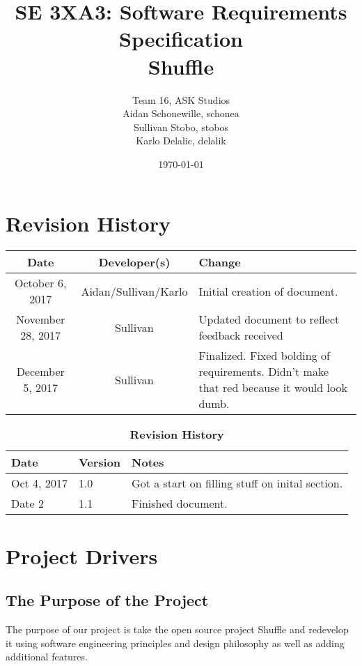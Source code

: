 \documentclass[12pt, titlepage]{article}
\title{SE 3XA3: Software Requirements Specification\\Shuffle}
\author{Team 16, ASK Studios
		\\ Aidan Schonewille, schonea
		\\ Sullivan Stobo, stobos
		\\ Karlo Delalic, delalik
}
\date{\today}
\begin{document}
\section*{Revision History}
\begin{center}
\begin{tabular}{| c | c | p{6cm} |}
\hline
\textbf{Date} & \textbf{Developer(s)} & \textbf{Change}\\
\hline
October 6, 2017 & Aidan/Sullivan/Karlo & Initial creation of document.\\
\hline
November 28, 2017 & Sullivan & Updated document to reflect feedback received \\
\hline
December 5, 2017 & Sullivan & Finalized.  Fixed bolding of requirements.  Didn't make that red because it would look dumb. \\
\hline
\end{tabular}
\end{center}

\maketitle

\tableofcontents
\listoftables
\listoffigures

\begin{table}[bp]
\caption{\bf Revision History}
\begin{tabularx}{\textwidth}{p{3cm}p{2cm}X}
\toprule {\bf Date} & {\bf Version} & {\bf Notes}\\
\midrule
Oct 4, 2017 & 1.0 & Got a start on filling stuff on inital section.\\
Date 2 & 1.1 & Finished document.\\
\bottomrule
\end{tabularx}
\end{table}

\newpage


\section{Project Drivers}

\subsection{The Purpose of the Project}

The purpose of our project is take the open source project Shuffle and redevelop it using software engineering principles and design philosophy as well as adding additional features.  
\end{document}
